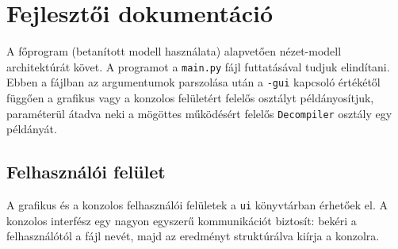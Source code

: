 \chapter{Fejlesztői dokumentáció}
\label{ch:impl}

A főprogram (betanított modell használata) alapvetően nézet-modell
architektúrát követ. A programot a \texttt{main.py} fájl futtatásával tudjuk elindítani.
Ebben a fájlban az argumentumok parszolása után a \texttt{-gui} kapcsoló értékétől függően
a grafikus vagy a konzolos felületért felelős osztályt példányosítjuk, paraméterül átadva neki
a mögöttes működésért felelős \texttt{Decompiler} osztály egy példányát.

\section{Felhasználói felület}
A grafikus és a konzolos felhasználói felületek a \texttt{ui} könyvtárban
érhetőek el. A konzolos interfész egy nagyon egyszerű kommunikációt biztosít:
bekéri a felhasználótól a fájl nevét, majd az eredményt struktúrálva kiírja
a konzolra.

